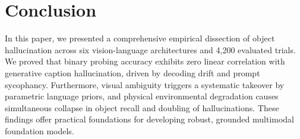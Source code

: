 \documentclass[conference]{IEEEtran}
\begin{document}
\section{Conclusion}
In this paper, we presented a comprehensive empirical dissection of object hallucination across six vision-language architectures and 4,200 evaluated trials. We proved that binary probing accuracy exhibits zero linear correlation with generative caption hallucination, driven by decoding drift and prompt sycophancy. Furthermore, visual ambiguity triggers a systematic takeover by parametric language priors, and physical environmental degradation causes simultaneous collapse in object recall and doubling of hallucinations. These findings offer practical foundations for developing robust, grounded multimodal foundation models.

\newpage
\end{document}
